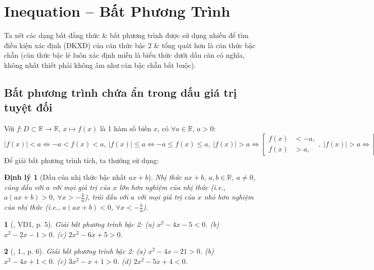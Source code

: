 \documentclass{article}
\newtheorem{baitoan}{}
\newtheorem{dinhly}{Định lý}
\begin{document}

\section{Inequation -- Bất Phương Trình}
Ta xét các dạng bất đẳng thức \& bất phương trình được sử dụng nhiều để tìm điều kiện xác định (ĐKXĐ) của căn thức bậc 2 \& tổng quát hơn là căn thức bậc chẵn (căn thức bậc lẻ luôn xác định miễn là biểu thức dưới dấu căn có nghĩa, không nhất thiết phải không âm như căn bậc chẵn bắt buộc).

\subsection{Bất phương trình chứa ẩn trong dấu giá trị tuyệt đối}
Với $f:D\subset\mathbb{R}\to\mathbb{R}$, $x\mapsto f(x)$ là 1 hàm số biến $x$, có $\forall a\in\mathbb{R}$, $a > 0$:
\begin{equation*}
	\boxed{|f(x)| < a\Leftrightarrow -a < f(x) < a,\ |f(x)|\le a\Leftrightarrow -a\le f(x)\le a,\ |f(x)| > a\Leftrightarrow\left[\begin{split}
			f(x) &< -a,\\
			f(x) &> a,
		\end{split}\right.,\ |f(x)| > a\Leftrightarrow\left[\begin{split}
			f(x) &\le -a,\\
			f(x) &\ge a.
		\end{split}\right.}
\end{equation*}
Để giải bất phương trình tích, ta thường sử dụng:

\begin{dinhly}[Dấu của nhị thức bậc nhất $ax + b$]
	Nhị thức $ax + b$, $a,b\in\mathbb{R}$, $a\ne0$, cùng dấu với $a$ với mọi giá trị của $x$ lớn hơn nghiệm của nhị thức (i.e., $a(ax + b) > 0$, $\forall x > -\frac{b}{a}$), trái dấu với $a$ với mọi giá trị của $x$ nhỏ hơn nghiệm của nhị thức (i.e., $a(ax + b) < 0$, $\forall x < -\frac{b}{a}$).
\end{dinhly}

\begin{baitoan}[\cite{Binh_Toan_9_tap_1}, VD1, p. 5]
	Giải bất phương trình bậc 2: (a) $x^2 - 4x - 5 < 0$. (b) $x^2 - 2x - 1 > 0$. (c) $2x^2 - 6x + 5 > 0$.
\end{baitoan}

\begin{baitoan}[\cite{Binh_Toan_9_tap_1}, 1., p. 6]
	Giải bất phương trình bậc 2: (a) $x^2 - 4x - 21 > 0$. (b) $x^2 - 4x + 1 < 0$. (c) $3x^2 - x + 1 > 0$. (d) $2x^2 - 5x + 4 < 0$.
\end{baitoan}
\end{document}
